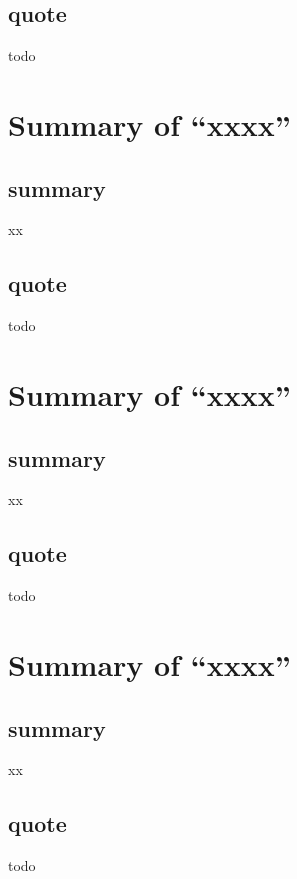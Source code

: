 \documentclass{llncs}
\begin{document}
\subsection{quote}
todo

\newpage

\section{Summary of ``xxxx''\cite{xxxxxxx}} 
  \label{section:xxxxxx}
\subsection{summary}
xx

\subsection{quote}
todo

\newpage

\section{Summary of ``xxxx''\cite{xxxxxxx}} 
  \label{section:xxxxxx}
\subsection{summary}
xx

\subsection{quote}
todo

\newpage

\section{Summary of ``xxxx''\cite{xxxxxxx}} 
  \label{section:xxxxxx}
\subsection{summary}
xx

\subsection{quote}
todo

\newpage

% 


 
 
\end{document}
